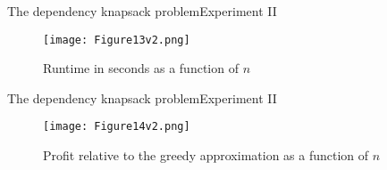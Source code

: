 \documentclass{beamer}
\begin{document}
\begin{frame}{The dependency knapsack problem}{Experiment II} %
    \begin{figure}
        \centering
        \texttt{[image: Figure13v2.png]}
        \caption{Runtime in seconds as a function of $n$}
    \end{figure}
\end{frame}

\begin{frame}{The dependency knapsack problem}{Experiment II} %
    \begin{figure}
        \centering
        \texttt{[image: Figure14v2.png]}
        \caption{Profit relative to the greedy approximation as a function
        of $n$}
    \end{figure}
\end{frame}
\end{document}
